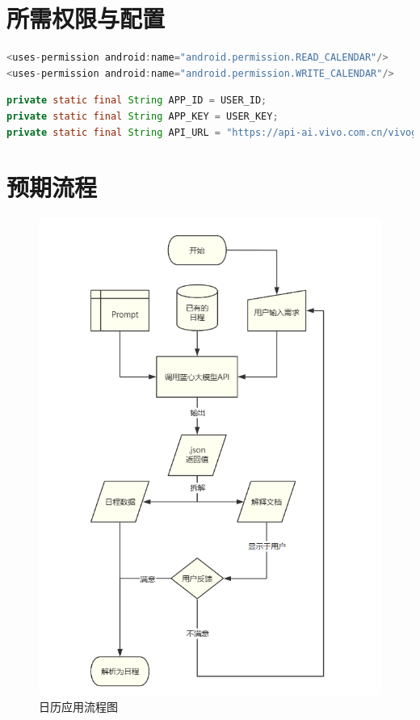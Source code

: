 \documentclass[fontset=windows]{ctexart}
\begin{document}
\newpage{}
\section{所需权限与配置}
\begin{lstlisting}[language=Java, caption=日历读取相关权限]
<uses-permission android:name="android.permission.READ_CALENDAR"/>
<uses-permission android:name="android.permission.WRITE_CALENDAR"/>
\end{lstlisting}
\begin{lstlisting}[language=Java, caption=API调用相关参数]
private static final String APP_ID = USER_ID;
private static final String APP_KEY = USER_KEY;
private static final String API_URL = "https://api-ai.vivo.com.cn/vivogpt/completions";
\end{lstlisting}

\newpage{}
\section{预期流程}
\begin{figure}[h]
    \small
    \centering
    \includegraphics[width=12cm]{figure/flowchart.png}
    \caption{日历应用流程图}
\end{figure}
\end{document}

